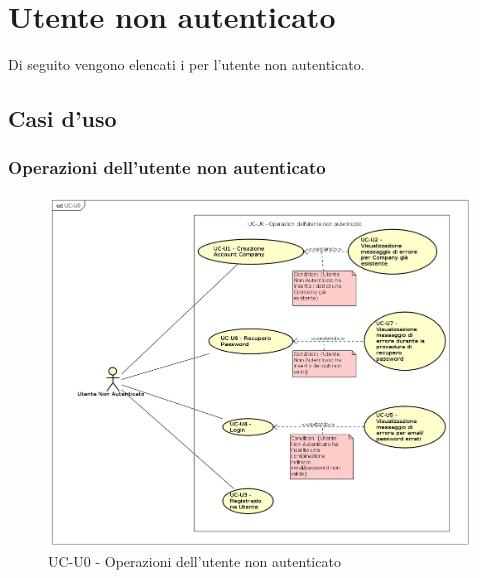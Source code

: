 \section{Utente non autenticato}

Di seguito vengono elencati i  per l'utente non autenticato.

\subsection{Casi d'uso}

\subsubsection{Operazioni dell'utente non autenticato}
  
    \begin{figure}[H]
      \begin{center}
        \includegraphics[width=12cm]{res/img/UCUtenti/UCUtenteNA/UC-U0.png}
      \caption{UC-U0 - Operazioni dell'utente non autenticato}
      \end{center} 
    \end{figure}    
    
